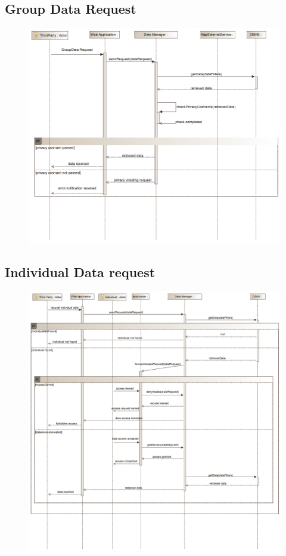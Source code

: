 \subsection{Group Data Request}
\begin{figure}[h]
\centering
\includegraphics[width=\linewidth]{resources/uml/sequence/RequestGroupData.png}
\end{figure}

\subsection{Individual Data request}
\begin{figure}[h]
\centering
\includegraphics[width=\linewidth]{resources/uml/sequence/RequestIndividualData.png}
\end{figure}

